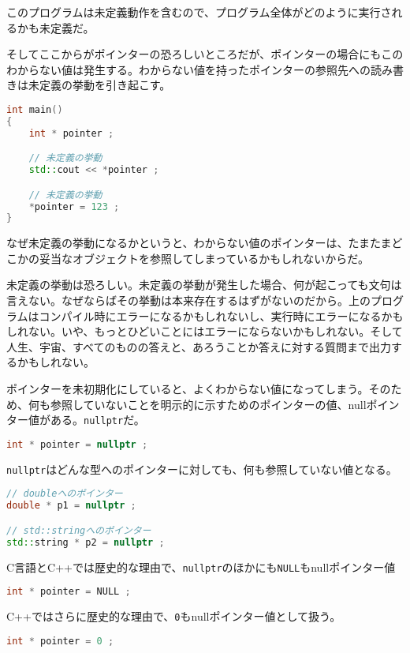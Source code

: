 このプログラムは未定義動作を含むので、プログラム全体がどのように実行されるかも未定義だ。

そしてここからがポインターの恐ろしいところだが、ポインターの場合にもこのわからない値は発生する。わからない値を持ったポインターの参照先への読み書きは未定義の挙動を引き起こす。

\begin{lstlisting}[language={C++}]
int main()
{
    int * pointer ;

    // 未定義の挙動
    std::cout << *pointer ;

    // 未定義の挙動
    *pointer = 123 ;
}
\end{lstlisting}

なぜ未定義の挙動になるかというと、わからない値のポインターは、たまたまどこかの妥当なオブジェクトを参照してしまっているかもしれないからだ。

未定義の挙動は恐ろしい。未定義の挙動が発生した場合、何が起こっても文句は言えない。なぜならばその挙動は本来存在するはずがないのだから。上のプログラムはコンパイル時にエラーになるかもしれないし、実行時にエラーになるかもしれない。いや、もっとひどいことにはエラーにならないかもしれない。そして人生、宇宙、すべてのものの答えと、あろうことか答えに対する質問まで出力するかもしれない。


ポインターを未初期化にしていると、よくわからない値になってしまう。そのため、何も参照していないことを明示的に示すためのポインターの値、nullポインター値がある。\texttt{nullptr}だ。

\begin{lstlisting}[language={C++}]
int * pointer = nullptr ;
\end{lstlisting}

\texttt{nullptr}はどんな型へのポインターに対しても、何も参照していない値となる。

\begin{lstlisting}[language={C++}]
// doubleへのポインター
double * p1 = nullptr ;

// std::stringへのポインター
std::string * p2 = nullptr ;
\end{lstlisting}

C言語とC++では歴史的な理由で、\texttt{nullptr}のほかにも\texttt{NULL}もnullポインター値
\begin{lstlisting}[language={C++}]
int * pointer = NULL ;
\end{lstlisting}
C++ではさらに歴史的な理由で、\texttt{0}もnullポインター値として扱う。
\begin{lstlisting}[language={C++}]
int * pointer = 0 ;
\end{lstlisting}

